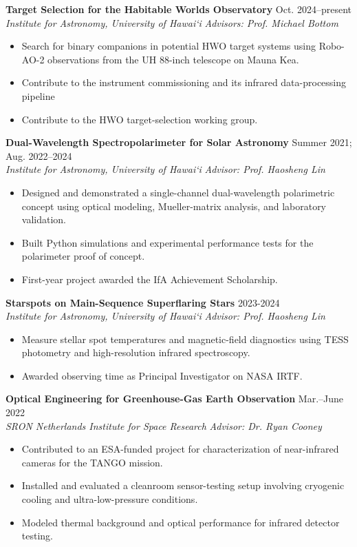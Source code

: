 \documentclass[11pt,letterpaper]{article}
\newcommand{\cvheading}[4]{%
  \textbf{#1} \hfill #2\\
  \textit{#3} \hfill \textit{#4}\par
}
\begin{document}
\cvheading{Target Selection for the Habitable Worlds Observatory}{Oct. 2024--present}{Institute for Astronomy, University of Hawai`i}{Advisors: Prof. Michael Bottom}
\begin{itemize}
  \item Search for binary companions in potential HWO target systems using Robo-AO-2 observations from the UH 88-inch telescope on Mauna Kea.
  \item Contribute to the instrument commissioning and its infrared data-processing pipeline
  \item Contribute to the HWO target-selection working group.
\end{itemize}

\cvheading{Dual-Wavelength Spectropolarimeter for Solar Astronomy}{Summer 2021; Aug. 2022--2024}{Institute for Astronomy, University of Hawai`i}{Advisor: Prof. Haosheng Lin}
\begin{itemize}
  \item Designed and demonstrated a single-channel dual-wavelength polarimetric concept using optical modeling, Mueller-matrix analysis, and laboratory validation.
  \item Built Python simulations and experimental performance tests for the polarimeter proof of concept.
  \item First-year project awarded the IfA Achievement Scholarship.
\end{itemize}

\cvheading{Starspots on Main-Sequence Superflaring Stars}{2023-2024}{Institute for Astronomy, University of Hawai`i}{Advisor: Prof. Haosheng Lin}
\begin{itemize}
  \item Measure stellar spot temperatures and magnetic-field diagnostics using TESS photometry and high-resolution infrared spectroscopy.
  \item Awarded observing time as Principal Investigator on NASA IRTF.
\end{itemize}

\cvheading{Optical Engineering for Greenhouse-Gas Earth Observation}{Mar.--June 2022}{SRON Netherlands Institute for Space Research}{Advisor: Dr. Ryan Cooney}
\begin{itemize}
  \item Contributed to an ESA-funded project for characterization of near-infrared cameras for the TANGO mission.
  \item Installed and evaluated a cleanroom sensor-testing setup involving cryogenic cooling and ultra-low-pressure conditions.
  \item Modeled thermal background and optical performance for infrared detector testing.
\end{itemize}
\end{document}
